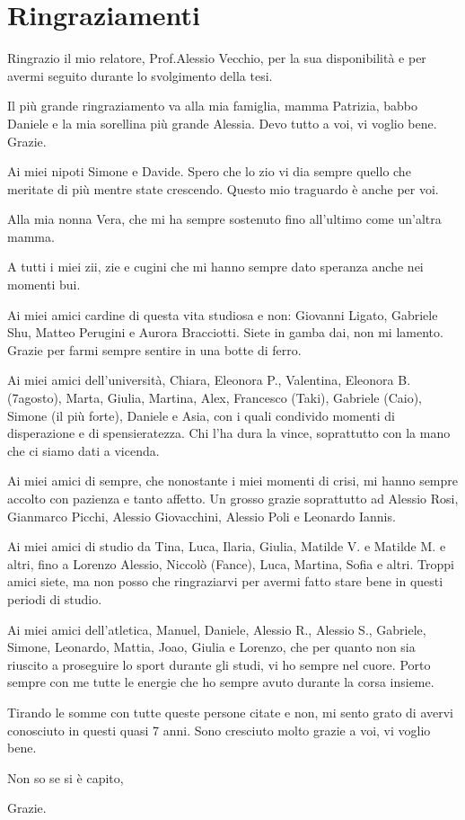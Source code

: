 \chapter{Ringraziamenti}

Ringrazio il mio relatore, Prof.\@ Alessio Vecchio, per la sua disponibilità e per avermi seguito durante lo svolgimento
della tesi.\medskip

Il più grande ringraziamento va alla mia famiglia, mamma Patrizia, babbo Daniele e la mia sorellina 
più grande Alessia.
Devo tutto a voi, vi voglio bene. Grazie.\medskip

Ai miei nipoti Simone e Davide. Spero che lo zio vi dia sempre quello
che meritate di più mentre state crescendo. Questo mio traguardo è anche per voi.\medskip

Alla mia nonna Vera, che mi ha sempre sostenuto fino all'ultimo come un'altra mamma.\medskip

A tutti i miei zii, zie e cugini che mi hanno sempre dato speranza anche nei momenti bui.\medskip

Ai miei amici cardine di questa vita studiosa e non: Giovanni Ligato, Gabriele Shu, Matteo Perugini
e Aurora Bracciotti. Siete in gamba dai, non mi lamento. Grazie per farmi sempre sentire
in una botte di ferro.\medskip

Ai miei amici dell'università, Chiara, Eleonora P., Valentina, Eleonora B. (7agosto), Marta, 
Giulia, Martina, Alex, Francesco (Taki), Gabriele (Caio), Simone (il più forte), Daniele e Asia,
con i quali condivido momenti di disperazione e di spensieratezza. Chi l'ha dura la vince, soprattutto
con la mano che ci siamo dati a vicenda.\medskip

Ai miei amici di sempre, che nonostante i miei momenti di crisi, mi hanno sempre accolto con pazienza
e tanto affetto. Un grosso grazie soprattutto ad Alessio Rosi, Gianmarco Picchi, Alessio Giovacchini,
Alessio Poli e Leonardo Iannis.\medskip

Ai miei amici di studio da Tina, Luca, Ilaria, Giulia, Matilde V. e Matilde M. e altri, fino a Lorenzo
Alessio, Niccolò (Fance), Luca, Martina, Sofia e altri. Troppi amici siete, ma non posso che ringraziarvi
per avermi fatto stare bene in questi periodi di studio.\medskip

Ai miei amici dell'atletica, Manuel, Daniele, Alessio R., Alessio S., Gabriele, Simone, Leonardo, Mattia,
Joao, Giulia e Lorenzo, che per quanto non sia riuscito a proseguire lo sport durante gli studi, vi ho
sempre nel cuore. Porto sempre con me tutte le energie che ho sempre avuto durante la corsa insieme.\medskip

Tirando le somme con tutte queste persone citate e non, mi sento grato di avervi conosciuto in questi
quasi 7 anni. Sono cresciuto molto grazie a voi, vi voglio bene.\medskip

Non so se si è capito,

Grazie.
